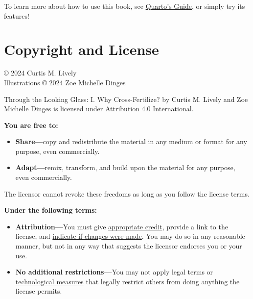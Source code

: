 \documentclass[
  letterpaper,
]{book}
\providecommand{\tightlist}{%
  \setlength{\itemsep}{0pt}\setlength{\parskip}{0pt}}\usepackage{longtable,booktabs,array}
\begin{document}
To learn more about how to use this book, see
\href{https://quarto.org/docs/guide/}{Quarto's Guide}, or simply try its
features!

\section*{Copyright and License}\label{copyright-and-license}


© 2024 Curtis M. Lively\\
Illustrations © 2024 Zoe Michelle Dinges

Through the Looking Glass: I. Why Cross-Fertilize? by {Curtis M. Lively
and Zoe Michelle Dinges} is licensed under Attribution 4.0
International.

\textbf{You are free to:}

\begin{itemize}
\tightlist
\item
  \textbf{Share---}copy and redistribute the material in any medium or
  format for any purpose, even commercially.\\
\item
  \textbf{Adapt---}remix, transform, and build upon the material for any
  purpose, even commercially.
\end{itemize}

The licensor cannot revoke these freedoms as long as you follow the
license terms.

\textbf{Under the following terms:}

\begin{itemize}
\tightlist
\item
  \textbf{Attribution---}You must give
  \href{https://creativecommons.org/licenses/by/4.0/\#ref-appropriate-credit}{appropriate
  credit}, provide a link to the license, and
  \href{https://creativecommons.org/licenses/by/4.0/\#ref-indicate-changes}{indicate
  if changes were made}. You may do so in any reasonable manner, but not
  in any way that suggests the licensor endorses you or your use.\\
\item
  \textbf{No additional restrictions---}You may not apply legal terms or
  \href{https://creativecommons.org/licenses/by/4.0/\#ref-technological-measures}{technological
  measures} that legally restrict others from doing anything the license
  permits.
\end{itemize}
\end{document}
